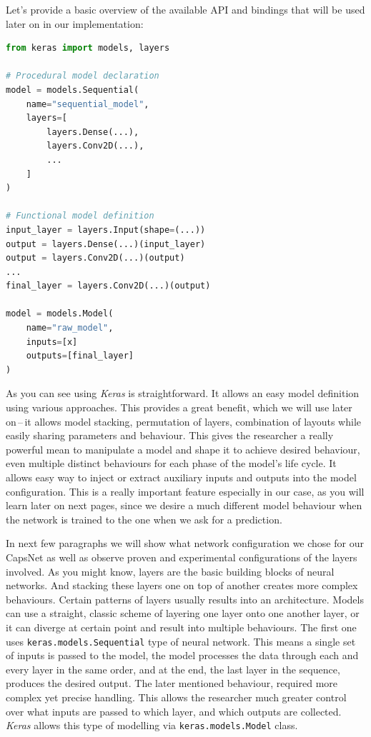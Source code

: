 Let's provide a basic overview of the available API and bindings that will be used later on in our implementation:

\begin{lstlisting}[language=Python, caption=Keras example]
from keras import models, layers

# Procedural model declaration
model = models.Sequential(
    name="sequential_model",
    layers=[
        layers.Dense(...),
        layers.Conv2D(...),
        ...
    ]
)

# Functional model definition
input_layer = layers.Input(shape=(...))
output = layers.Dense(...)(input_layer)
output = layers.Conv2D(...)(output)
...
final_layer = layers.Conv2D(...)(output)

model = models.Model(
    name="raw_model",
    inputs=[x]
    outputs=[final_layer]
)
\end{lstlisting}

As you can see using \textit{Keras} is straightforward. It allows an easy model definition using various approaches. This provides a great benefit, which we will use later on\,--\,it allows model stacking, permutation of layers, combination of layouts while easily sharing parameters and behaviour. This gives the researcher a really powerful mean to manipulate a model and shape it to achieve desired behaviour, even multiple distinct behaviours for each phase of the model's life cycle. It allows easy way to inject or extract auxiliary inputs and outputs into the model configuration. This is a really important feature especially in our case, as you will learn later on next pages, since we desire a much different model behaviour when the network is trained to the one when we ask for a prediction.

In next few paragraphs we will show what network configuration we chose for our CapsNet as well as observe proven and experimental configurations of the layers involved. As you might know, layers are the basic building blocks of neural networks. And stacking these layers one on top of another creates more complex behaviours. Certain patterns of layers usually results into an architecture. Models can use a straight, classic scheme of layering one layer onto one another layer, or it can diverge at certain point and result into multiple behaviours. The first one uses \texttt{keras.models.Sequential} type of neural network. This means a single set of inputs is passed to the model, the model processes the data through each and every layer in the same order, and at the end, the last layer in the sequence, produces the desired output. The later mentioned behaviour, required more complex yet precise handling. This allows the researcher much greater control over what inputs are passed to which layer, and which outputs are collected. \textit{Keras} allows this type of modelling via \texttt{keras.models.Model} class.

